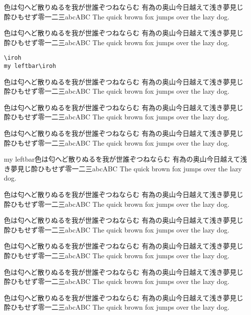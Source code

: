 \documentclass[a5paper]{jarticle}
\newenvironment{lightgrayleftbar}{%
  \def\FrameCommand{\textcolor{lightgray}{\vrule width 1zw} \hspace{10pt}}%
  \MakeFramed {\advance\hsize-\width \FrameRestore}}%
{\endMakeFramed}
\newenvironment{myleftbar}{%
   \def\FrameCommand{\vrule width 1pt \hspace{10pt}}%
   \MakeFramed {\advance\hsize-\width \FrameRestore}}%
{\endMakeFramed}
\def\iroh{色は匂へど散りぬるを我が世誰ぞつねならむ
有為の奥山今日越えて浅き夢見じ酔ひもせず零一二三abcABC
The quick brown fox jumps over the lazy dog.}
\begin{document}
\iroh

\begin{framed}
\iroh
\end{framed}

\begin{framed}
\begin{verbatim}
\iroh
my leftbar\iroh
\end{verbatim}
\end{framed}


\iroh

\begin{center}
\begin{minipage}{.5\textwidth}
\begin{lightgrayleftbar}
\iroh
\end{lightgrayleftbar}
\end{minipage}
\end{center}

\iroh

\begin{myleftbar}
my leftbar\iroh
\end{myleftbar}

\iroh

\begin{center}
\begin{minipage}{.5\textwidth}
\begin{myleftbar}
\iroh
\end{myleftbar}
\end{minipage}
\end{center}

\iroh


\begin{myleftbar}
\iroh
\end{myleftbar}


\iroh
\end{document}
